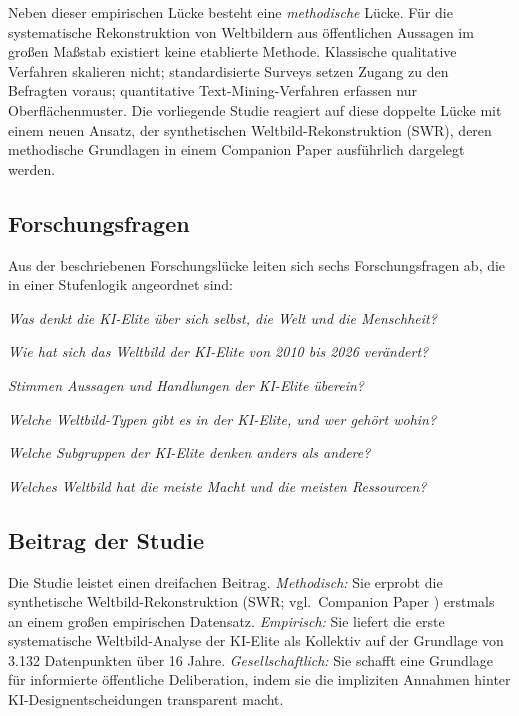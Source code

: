 \documentclass[12pt,a4paper]{article}
\begin{document}
Neben dieser empirischen L\"ucke besteht eine \emph{methodische} L\"ucke. F\"ur die systematische Rekonstruktion von Weltbildern aus \"offentlichen Aussagen im gro\ss{}en Ma\ss{}stab existiert keine etablierte Methode. Klassische qualitative Verfahren skalieren nicht; standardisierte Surveys setzen Zugang zu den Befragten voraus; quantitative Text-Mining-Verfahren erfassen nur Oberfl\"achenmuster. Die vorliegende Studie reagiert auf diese doppelte L\"ucke mit einem neuen Ansatz, der synthetischen Weltbild-Rekonstruktion (SWR), deren methodische Grundlagen in einem Companion Paper \citep{Geiger2026SWR} ausf\"uhrlich dargelegt werden.


\subsection{Forschungsfragen}
\label{sec:einleitung:fragen}

Aus der beschriebenen Forschungsl\"ucke leiten sich sechs Forschungsfragen ab, die in einer Stufenlogik angeordnet sind:

\begin{description}[style=nextline, leftmargin=1.5cm]
  \item[F1: WELTBILD (deskriptiv)] \emph{Was denkt die KI-Elite \"uber sich selbst, die Welt und die Menschheit?}
  \item[F2: WANDEL (l\"angsschnittlich)] \emph{Wie hat sich das Weltbild der KI-Elite von 2010 bis 2026 ver\"andert?}
  \item[F3: KONGRUENZ (validierend)] \emph{Stimmen Aussagen und Handlungen der KI-Elite \"uberein?}
  \item[F4: CLUSTER (explorativ)] \emph{Welche Weltbild-Typen gibt es in der KI-Elite, und wer geh\"ort wohin?}
  \item[F5: DIFFERENZ (vergleichend)] \emph{Welche Subgruppen der KI-Elite denken anders als andere?}
  \item[F6: MACHT (normativ)] \emph{Welches Weltbild hat die meiste Macht und die meisten Ressourcen?}
\end{description}


\subsection{Beitrag der Studie}
\label{sec:einleitung:beitrag}

Die Studie leistet einen dreifachen Beitrag. \emph{Methodisch:} Sie erprobt die synthetische Weltbild-Rekonstruktion (SWR; vgl.\ Companion Paper \citealt{Geiger2026SWR}) erstmals an einem gro\ss{}en empirischen Datensatz. \emph{Empirisch:} Sie liefert die erste systematische Weltbild-Analyse der KI-Elite als Kollektiv auf der Grundlage von 3.132 Datenpunkten \"uber 16 Jahre. \emph{Gesellschaftlich:} Sie schafft eine Grundlage f\"ur informierte \"offentliche Deliberation, indem sie die impliziten Annahmen hinter KI-Designentscheidungen transparent macht.
\end{document}
